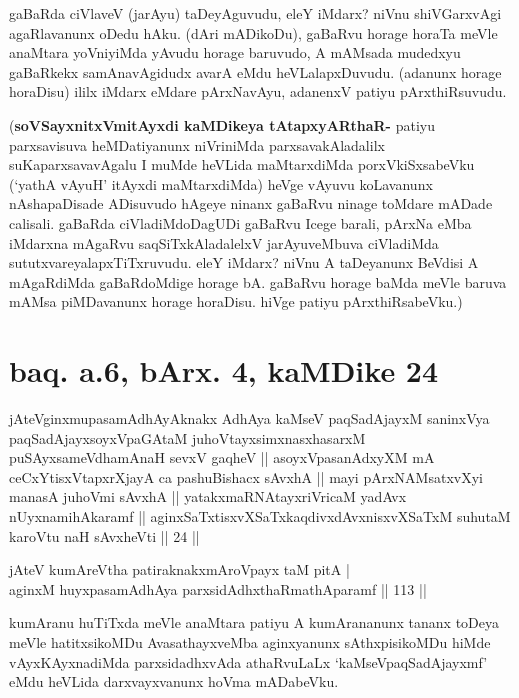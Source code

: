 \begin{artha}
gaBaRda ciVlaveV (jarAyu) taDeyAguvudu, eleY iMdarx? niVnu shiVGarxvAgi 
agaRlavanunx oDedu hAku. (dAri mADikoDu), gaBaRvu horage horaTa meVle 
anaMtara yoVniyiMda yAvudu horage baruvudo, A mAMsada mudedxyu 
gaBaRkekx samAnavAgidudx avarA eMdu heVLalapxDuvudu. (adanunx horage 
horaDisu) ililx iMdarx eMdare pArxNavAyu, adanenxV patiyu 
pArxthiRsuvudu.

(\textbf{soVSayxnitxVmitAyxdi kaMDikeya tAtapxyARthaR-} patiyu 
parxsavisuva heMDatiyanunx niVriniMda parxsavakAladalilx 
suKaparxsavavAgalu I muMde heVLida maMtarxdiMda porxVkiSxsabeVku 
(`yathA vAyuH' itAyxdi maMtarxdiMda) heVge vAyuvu koLavanunx 
nAshapaDisade ADisuvudo hAgeye ninanx gaBaRvu ninage toMdare mADade 
calisali. gaBaRda ciVladiMdoDagUDi gaBaRvu Icege barali, pArxNa eMba 
iMdarxna mAgaRvu saqSiTxkAladalelxV jarAyuveMbuva ciVladiMda 
sututxvareyalapxTiTxruvudu. eleY iMdarx? niVnu A taDeyanunx BeVdisi A 
mAgaRdiMda gaBaRdoMdige horage bA. gaBaRvu horage baMda meVle baruva 
mAMsa piMDavanunx horage horaDisu. hiVge patiyu pArxthiRsabeVku.)
\end{artha}

\section*{baq. a.6, bArx. 4, kaMDike 24}

\begin{shl}
jAteV\s ginxmupasamAdhAyAknakx AdhAya kaMseV paqSadAjayxM saninxVya paqSadAjayxsoyxVpaGAtaM juhoVtayxsimxnasxhasarxM puSAyxsameVdhamAnaH sevxV gaqheV || asoyxVpasanAdxyXM mA ceCxYtisxVtapxrXjayA ca pashuBishacx sAvxhA || mayi pArxNAMsatxvXyi manasA juhoVmi sAvxhA || yatakxmaRNAtayxriVricaM yadAvx nUyxnamihAkaramf || aginxSaTxtisxvXSaTxkaqdivxdAvxnisxvXSaTxM suhutaM karoVtu naH sAvxheVti || 24 ||
\end{shl}


\begin{shl}
jAteV kumAreV\s tha patiraknakxmAroVpayx taM pitA | \\
aginxM huyxpasamAdhAya parxsidAdhxthaRmathAparamf \hfill|| 113 || 
\end{shl}

\begin{artha}
kumAranu huTiTxda meVle anaMtara patiyu A kumArananunx tananx toDeya 
meVle hatitxsikoMDu AvasathayxveMba aginxyanunx sAthxpisikoMDu hiMde 
vAyxKAyxnadiMda parxsidadhxvAda athaRvuLaLx `kaMseVpaqSadAjayxmf' eMdu 
heVLida darxvayxvanunx hoVma mADabeVku.
\end{artha}


